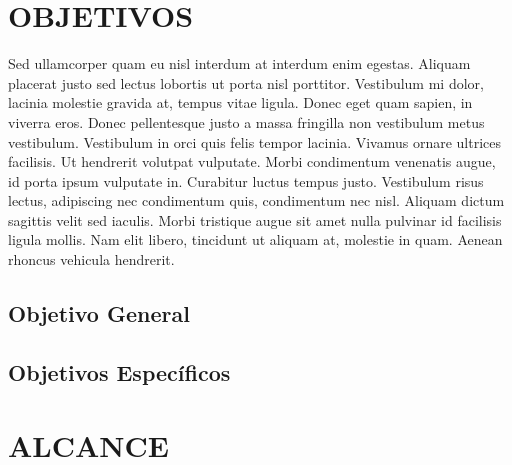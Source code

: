 
\section{OBJETIVOS}

Sed ullamcorper quam eu nisl interdum at interdum enim egestas. Aliquam placerat justo sed lectus lobortis ut porta nisl porttitor. Vestibulum mi dolor, lacinia molestie gravida at, tempus vitae ligula. Donec eget quam sapien, in viverra eros. Donec pellentesque justo a massa fringilla non vestibulum metus vestibulum. Vestibulum in orci quis felis tempor lacinia. Vivamus ornare ultrices facilisis. Ut hendrerit volutpat vulputate. Morbi condimentum venenatis augue, id porta ipsum vulputate in. Curabitur luctus tempus justo. Vestibulum risus lectus, adipiscing nec condimentum quis, condimentum nec nisl. Aliquam dictum sagittis velit sed iaculis. Morbi tristique augue sit amet nulla pulvinar id facilisis ligula mollis. Nam elit libero, tincidunt ut aliquam at, molestie in quam. Aenean rhoncus vehicula hendrerit.

\subsection{Objetivo General}

\subsection{Objetivos Específicos}


\section{ALCANCE}